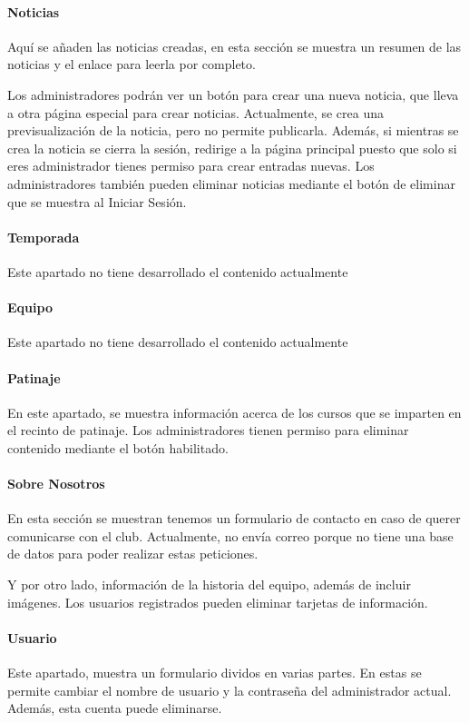 \documentclass[10pt, spanish, pdftex]{template/UC3M_document}
\begin{document}
\paragraph{Noticias}
Aquí se añaden las noticias creadas, en esta sección se muestra un resumen de las noticias y el enlace para leerla por completo.

Los administradores podrán ver un botón para crear una nueva noticia, que lleva a otra página especial para crear noticias. Actualmente, se crea una previsualización de la noticia, pero no permite publicarla. Además, si mientras se crea la noticia se cierra la sesión, redirige a la página principal puesto que solo si eres administrador tienes permiso para crear entradas nuevas.
Los administradores también pueden eliminar noticias mediante el botón de eliminar que se muestra al Iniciar Sesión.
\paragraph{Temporada}
Este apartado no tiene desarrollado el contenido actualmente

\paragraph{Equipo}
Este apartado no tiene desarrollado el contenido actualmente

\paragraph{Patinaje}
En este apartado, se muestra información acerca de los cursos que se imparten en el recinto de patinaje. Los administradores tienen permiso para eliminar contenido mediante el botón habilitado.

\paragraph{Sobre Nosotros}
En esta sección se muestran tenemos un formulario de contacto en caso de querer comunicarse con el club. Actualmente, no envía correo porque no tiene una base de datos para poder realizar estas peticiones.

Y por otro lado, información de la historia del equipo, además de incluir imágenes.
Los usuarios registrados pueden eliminar tarjetas de información.

\paragraph{Usuario}
Este apartado, muestra un formulario dividos en varias partes. En estas se permite cambiar el nombre de usuario y la contraseña del administrador actual. Además, esta cuenta puede eliminarse.
\end{document}
